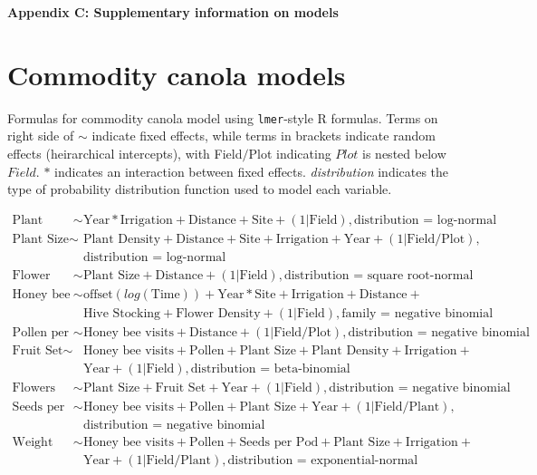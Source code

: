 \pagebreak
\begin{center}
\textbf{\large Appendix C: Supplementary information on models}
\end{center}

\section*{Commodity canola models}

Formulas for commodity canola model using \texttt{lmer}-style R formulas. Terms on right side of $\sim$ indicate fixed effects, while terms in brackets indicate random effects (heirarchical intercepts), with Field$/$Plot indicating $Plot$ is nested below $Field$. $*$ indicates an interaction between fixed effects. \textit{distribution} indicates the type of probability distribution function used to model each variable.

\begin{align*}
    \text{Plant Density} \sim & \text{Year}*\text{Irrigation} + \text{Distance} + \text{Site} + (1|\text{Field}), \text{distribution = log-normal} \\
    \text{Plant Size} \sim & \text{Plant Density} + \text{Distance} + \text{Site} + \text{Irrigation} + \text{Year} + (1|\text{Field/Plot}), \\
    &    \text{distribution = log-normal} \\
    \text{Flower Density} \sim & \text{Plant Size} + \text{Distance} + (1|\text{Field}), \text{distribution = square root-normal} \\
    \text{Honey bee visits} \sim & \text{offset}(log(\text{Time})) + \text{Year}*\text{Site} + \text{Irrigation} + \text{Distance} + \\
    &       \text{Hive Stocking} + \text{Flower Density} + (1|\text{Field}), \text{family = negative binomial}\\
    \text{Pollen per Stigma} \sim & \text{Honey bee visits} + \text{Distance} + (1|\text{Field/Plot}), \text{distribution = negative binomial} \\
    \text{Fruit Set} \sim & \text{Honey bee visits} + \text{Pollen} + \text{Plant Size} + \text{Plant Density} + \text{Irrigation} +\\
    &       \text{Year} + (1|\text{Field}), \text{distribution = beta-binomial} \\
    \text{Flowers per Plant} \sim & \text{Plant Size} + \text{Fruit Set} + \text{Year} + (1|\text{Field}), \text{distribution = negative binomial} \\
    \text{Seeds per Pod} \sim & \text{Honey bee visits} + \text{Pollen} + \text{Plant Size} + \text{Year} + (1|\text{Field/Plant}),\\ 
    &   \text{distribution = negative binomial} \\
    \text{Weight per Seed} \sim & \text{Honey bee visits} + \text{Pollen} + \text{Seeds per Pod} + \text{Plant Size} + \text{Irrigation} +\\
    &       \text{Year} + (1|\text{Field/Plant}), \text{distribution = exponential-normal} \\
\end{align*}

